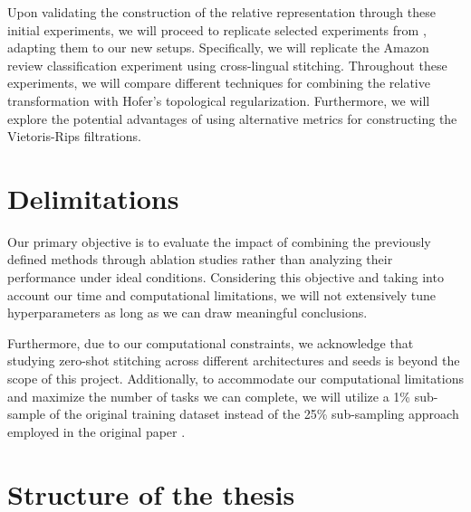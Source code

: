\documentclass[../main.tex]{subfiles}
\begin{document}
Upon validating the construction of the relative representation through these initial experiments, we will proceed to replicate selected experiments from \cite{moschella_relative_2022}, adapting them to our new setups. Specifically, we will replicate the Amazon review classification experiment using cross-lingual stitching. Throughout these experiments, we will compare different techniques for combining the relative transformation with Hofer's topological regularization. Furthermore, we will explore the potential advantages of using alternative metrics for constructing the Vietoris-Rips filtrations.

\section{Delimitations}
Our primary objective is to evaluate the impact of combining the previously defined methods through ablation studies rather than analyzing their performance under ideal conditions. Considering this objective and taking into account our time and computational limitations, we will not extensively tune hyperparameters as long as we can draw meaningful conclusions.


Furthermore, due to our computational constraints, we acknowledge that studying zero-shot stitching across different architectures and seeds is beyond the scope of this project. Additionally, to accommodate our computational limitations and maximize the number of tasks we can complete, we will utilize a 1\% sub-sample of the original training dataset instead of the 25\% sub-sampling approach employed in the original paper \cite{moschella_relative_2022}.


\section{Structure of the thesis}
\end{document}
